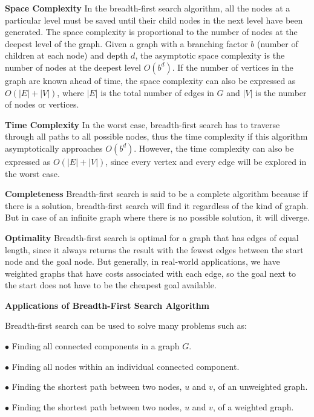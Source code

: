 \vskip 3mm
{\bf Space Complexity} In the breadth-first search algorithm, all the nodes at a particular level must be saved until their child nodes in the next level have been generated. The space complexity is proportional to the number of nodes at the deepest level of the graph. Given a graph with a branching factor $b$ (number of children at each node) and depth $d$, the asymptotic space complexity is the number of nodes at the deepest level $O(b^d)$. If the number of vertices in the graph are known ahead of time, the space complexity can also be expressed as $O(|E|+|V|)$, where $|E|$ is the total number of edges in $G$ and $|V|$ is the number of nodes or vertices.

\vskip 3mm
{\bf Time Complexity} In the worst case, breadth-first search has to traverse through all paths to all possible nodes, thus the time complexity if this algorithm asymptotically approaches $O(b^d)$. However, the time complexity can also be expressed as $O(|E|+|V|)$, since every vertex and every edge will be explored in the worst case.

\vskip 3mm
{\bf Completeness} Breadth-first search is said to be a complete algorithm because if there is a solution, breadth-first search will find it regardless of the kind of graph. But in case of an infinite graph where there is no possible solution, it will diverge.

\vskip 3mm
{\bf Optimality} Breadth-first search is optimal for a graph that has edges of equal length, since it always returns the result with the fewest edges between the start node and the goal node. But generally, in real-world applications, we have weighted graphs that have costs associated with each edge, so the goal next to the start does not have to be the cheapest goal available.

\vskip 3mm
{\bf Applications of Breadth-First Search Algorithm}

\vskip 1mm
Breadth-first search can be used to solve many problems such as:

\vskip 3mm
\qquad$\bullet$ Finding all connected components in a graph $G$.

\vskip 3mm
\qquad$\bullet$ Finding all nodes within an individual connected component.

\vskip 3mm
\qquad$\bullet$ Finding the shortest path between two nodes, $u$ and $v$, of an unweighted graph.

\vskip 3mm
\qquad$\bullet$ Finding the shortest path between two nodes, $u$ and $v$, of a weighted graph.


